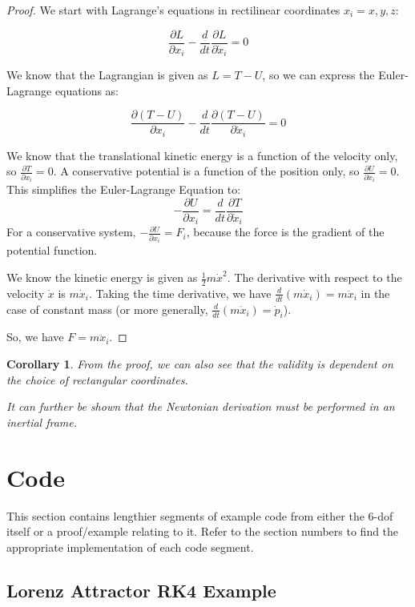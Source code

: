 \documentclass[12pt]{report}
\newtheorem{corollary}{Corollary}[theorem]
\begin{document}
{\begin{proof}
We start with Lagrange's equations in rectilinear coordinates $x_i=x,y,z$:

$$\frac{\partial L}{\partial x_i}-\frac{d}{dt}\frac{\partial L}{\partial \dot{x}_i}=0 $$

We know that the \gls{Lagrangian} is given as $L=T-U$, so we can express the Euler-Lagrange equations as:

$$\frac{\partial (T-U)}{\partial x_i}-\frac{d}{dt}\frac{\partial (T-U)}{\partial \dot{x}_i}=0$$

We know that the translational kinetic energy is a function of the velocity only, so $\frac{\partial T}{\partial x_i}=0$. A conservative potential is a function of the position only, so $\frac{\partial U}{\partial \dot{x}_i}=0$. This simplifies the Euler-Lagrange Equation to:
$$-\frac{\partial U}{\partial x_i}=\frac{d}{dt}\frac{\partial T}{\partial \dot{x}_i}$$
For a conservative system, $-\frac{\partial U}{\partial x_i}=F_i$, because the force is the gradient of the potential function.

We know the kinetic energy is given as $\frac{1}{2}m\dot{x}^2$. The derivative with respect to the velocity $\dot{x}$ is $m\dot{x}_i$. Taking the time derivative, we have $\frac{d}{dt}(m\dot{x}_i)=m\ddot{x}_i$ in the case of constant mass (or more generally,  $\frac{d}{dt}(m\dot{x}_i)=\dot{p}_i$).

So, we have $F=m\ddot{x}_i$.

\end{proof}
\begin{corollary}
    From the proof, we can also see that the validity is dependent on the choice of rectangular coordinates. 

    It can further be shown that the Newtonian derivation must be performed in an inertial frame.
\end{corollary}


\section{Code}
This section contains lengthier segments of example code from either the 6-\gls{dof} itself or a proof/example relating to it. Refer to the section numbers to find the appropriate implementation of each code segment.
\subsection{Lorenz Attractor RK4 Example}\label{sec:Lorenz Attractor RK4 Example}
\label{code:Lorenz}

}
\end{document}
